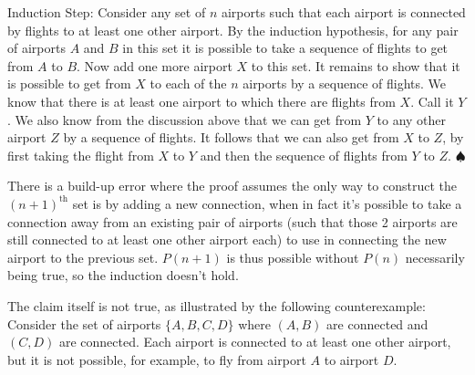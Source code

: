 \documentclass[11pt,fleqn]{article}
\begin{document}
\begin{enumerate}
Induction Step: Consider any set of $n$ airports such that each airport is connected by flights to at least one other airport.
By the induction hypothesis, for any pair of airports $A$ and $B$ in this set it is possible to take a sequence of flights to get from $A$ to $B$. Now add one more airport $X$ to this set. It remains to show that it is possible to get from $X$ to each of the $n$ airports by a 
sequence of flights. We know that there is at least one airport to which there are flights from $X$. Call it $Y$. We also know
from the discussion above that we can get from $Y$ to any other airport $Z$ by a sequence of flights. It follows that we can 
also get from $X$ to $Z$, by first taking the flight from $X$ to $Y$ and then the sequence of flights from $Y$ to $Z$. $\spadesuit$

There is a build-up error where the proof assumes the only way to construct the $(n+1)^\text{th}$ set is by adding a new connection, when in fact it's possible to take a connection away from an existing pair of airports (such that those 2 airports are still connected to at least one other airport each) to use in connecting the new airport to the previous set. $P(n+1)$ is thus possible without $P(n)$ necessarily being true, so the induction doesn't hold.

The claim itself is not true, as illustrated by the following counterexample: Consider the set of airports $\{A,B,C,D\}$ where $(A,B)$ are connected and $(C,D)$ are connected. Each airport is connected to at least one other airport, but it is not possible, for example, to fly from airport $A$ to airport $D$.


\end{enumerate}
\end{document}
